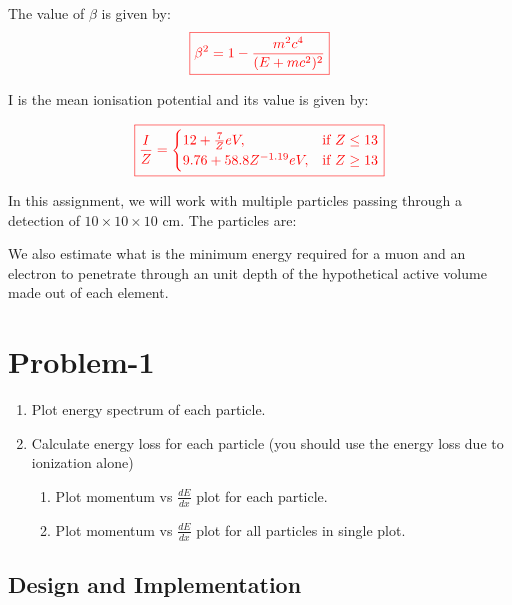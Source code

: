 \documentclass[a4paper,12pt]{article}
\begin{document}
The value of $\beta$ is given by:
\begin{equation}\textcolor{red}{\boxed{
    \beta^2 = 1-\frac{m^{2}c^4}{(E + mc^2)^2}}}
\end{equation}


I is the mean ionisation potential and its value is given by:


\begin{equation}\textcolor{red}{\boxed{
    \frac{I}{Z} =
\begin{cases}
     12 + \frac{7}{Z} eV ,& \text{if } Z \le 13\\
     9.76 + 58.8Z^{-1.19} eV ,& \text{if } Z \geq 13
\end{cases}}}
\end{equation}


In this assignment, we will work with multiple particles passing through a detection of $10 \times 10 \times 10   \text{ cm}.$ The particles are:


We also estimate what is the minimum energy required
for a muon and an electron to penetrate through an unit depth of the hypothetical active
volume made out of each element.
\newpage
\section{Problem-1}
\begin{enumerate}
    \item Plot energy spectrum of each particle.
    \item Calculate energy loss for each particle (you should use the energy loss due to
ionization alone)
\begin{enumerate}
    \item Plot momentum vs $\displaystyle{\frac{dE}{dx}}$ plot for each particle.
    \item Plot momentum vs $\displaystyle{\frac{dE}{dx}}$  plot for all particles in single plot.
\end{enumerate}
\end{enumerate}
\subsection{Design and Implementation}
\end{document}
